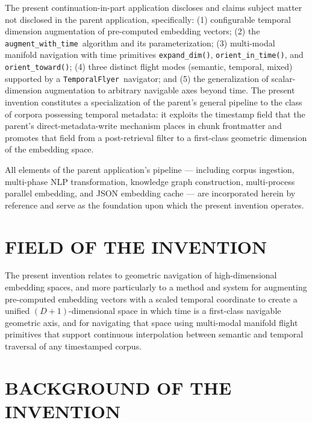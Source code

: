 \documentclass[12pt,letterpaper]{article}
\newcommand{\temporalflyer}{\texttt{TemporalFlyer}}
\newcommand{\augtime}{\texttt{augment\_with\_time}}
\newcommand{\expanddim}{\texttt{expand\_dim()}}
\newcommand{\orientintime}{\texttt{orient\_in\_time()}}
\newcommand{\orienttoward}{\texttt{orient\_toward()}}
\begin{document}
The present continuation-in-part application discloses and claims subject matter
not disclosed in the parent application, specifically: (1) configurable temporal
dimension augmentation of pre-computed embedding vectors; (2) the
\augtime\ algorithm and its parameterization; (3) multi-modal manifold navigation
with time primitives \expanddim, \orientintime, and \orienttoward; (4) three
distinct flight modes (semantic, temporal, mixed) supported by a
\temporalflyer\ navigator; and (5) the generalization of scalar-dimension
augmentation to arbitrary navigable axes beyond time. The present invention
constitutes a specialization of the parent's general pipeline to the class of
corpora possessing temporal metadata: it exploits the timestamp field that the
parent's direct-metadata-write mechanism places in chunk frontmatter and promotes
that field from a post-retrieval filter to a first-class geometric dimension of
the embedding space.

All elements of the parent application's pipeline --- including corpus ingestion,
multi-phase NLP transformation, knowledge graph construction, multi-process
parallel embedding, and JSON embedding cache --- are incorporated herein by
reference and serve as the foundation upon which the present invention operates.

\section*{FIELD OF THE INVENTION}

The present invention relates to geometric navigation of high-dimensional
embedding spaces, and more particularly to a method and system for augmenting
pre-computed embedding vectors with a scaled temporal coordinate to create a
unified $(D+1)$-dimensional space in which time is a first-class navigable
geometric axis, and for navigating that space using multi-modal manifold flight
primitives that support continuous interpolation between semantic and temporal
traversal of any timestamped corpus.

\section*{BACKGROUND OF THE INVENTION}
\end{document}
